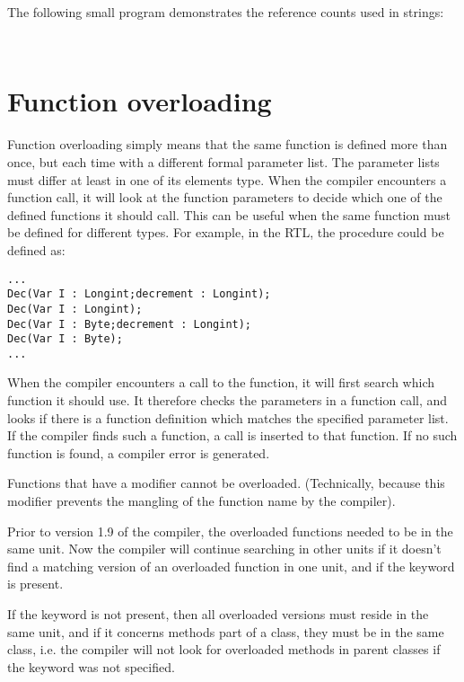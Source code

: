 The following small program demonstrates the reference counts used in strings:
\begin{verbatim}
 
\end{verbatim}


\section{Function overloading}
Function overloading simply means that the same function is defined more
than once, but each time with a different formal parameter list.
The parameter lists must differ at least in one of its elements type.
When the compiler encounters a function call, it will look at the function
parameters to decide which one of the defined functions it should call.
This can be useful when the same function must be defined for different
types. For example, in the RTL, the   procedure could be
 defined as:
\begin{verbatim}
...
Dec(Var I : Longint;decrement : Longint);
Dec(Var I : Longint);
Dec(Var I : Byte;decrement : Longint);
Dec(Var I : Byte);
...
\end{verbatim}
When the compiler encounters a call to the  function, it will first search
which function it should use. It therefore checks the parameters in a
function call, and looks if there is a function definition which matches the
specified parameter list. If the compiler finds such a function, a call is
inserted to that function. If no such function is found, a compiler error is
generated.

Functions that have a  modifier cannot be overloaded.
(Technically, because this modifier prevents the mangling of
the function name by the compiler).

Prior to version 1.9 of the compiler, the overloaded functions needed to be
in the same unit. Now the compiler will continue searching in other units if
it doesn't find a matching version of an overloaded function in one unit,
and if the  keyword is present. 

If the  keyword is not present, then all overloaded versions 
must reside in the same unit, and if it concerns methods part of a class,
they must be in the same class, i.e. the compiler will not look for
overloaded methods in parent classes if the  keyword was not
specified.


